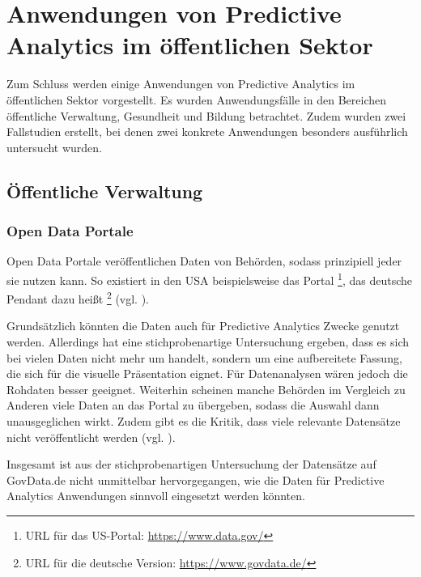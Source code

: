 \chapter{Anwendungen von Predictive Analytics im öffentlichen Sektor}

Zum Schluss werden einige Anwendungen von Predictive Analytics im öffentlichen
Sektor vorgestellt. Es wurden Anwendungsfälle in den Bereichen öffentliche Verwaltung,
Gesundheit und Bildung betrachtet. Zudem wurden zwei Fallstudien erstellt, bei denen
zwei konkrete Anwendungen besonders ausführlich untersucht wurden.


\section{Öffentliche Verwaltung}


\subsection{Open Data Portale}

Open Data Portale veröffentlichen Daten von Behörden, sodass prinzipiell jeder
sie nutzen kann. So existiert in den USA beispielsweise das Portal \grqq{}\footnote{
URL für das US-Portal: \url{https://www.data.gov/}
}, das deutsche Pendant dazu heißt \grqq{}\footnote{
URL für die deutsche Version: \url{https://www.govdata.de/} 
} (vgl. \cite{Borchers}). 

Grundsätzlich könnten die Daten auch für Predictive Analytics Zwecke genutzt werden.
Allerdings hat eine stichprobenartige Untersuchung ergeben, dass es sich bei vielen Daten
nicht mehr um \grqq{} handelt, sondern um eine aufbereitete Fassung, die sich
für die visuelle Präsentation eignet. Für Datenanalysen wären jedoch die Rohdaten besser geeignet.
Weiterhin scheinen manche Behörden im Vergleich zu Anderen viele Daten an das Portal zu übergeben,
sodass die Auswahl dann unausgeglichen wirkt. Zudem gibt es die Kritik, dass viele relevante
Datensätze nicht veröffentlicht werden (vgl. \cite{Krempl}).

Insgesamt ist aus der stichprobenartigen Untersuchung der Datensätze auf GovData.de nicht unmittelbar
hervorgegangen, wie die Daten für Predictive Analytics Anwendungen sinnvoll eingesetzt werden könnten. 


